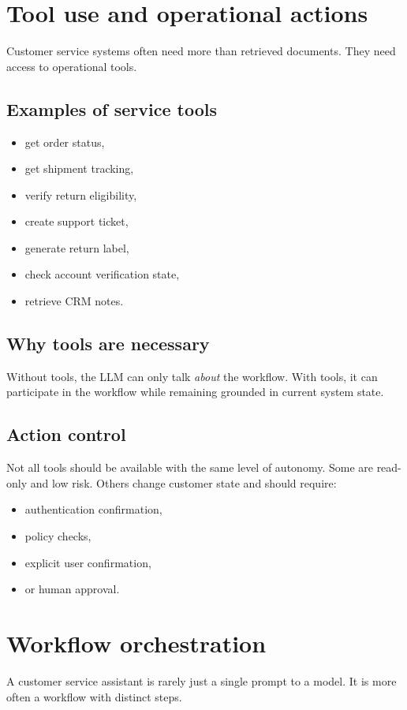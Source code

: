 \section{Tool use and operational actions}
Customer service systems often need more than retrieved documents.
They need access to operational tools.

\subsection{Examples of service tools}
\begin{itemize}
  \item get order status,
  \item get shipment tracking,
  \item verify return eligibility,
  \item create support ticket,
  \item generate return label,
  \item check account verification state,
  \item retrieve CRM notes.
\end{itemize}

\subsection{Why tools are necessary}
Without tools, the LLM can only talk \emph{about} the workflow.
With tools, it can participate in the workflow while remaining grounded in current system state.

\subsection{Action control}
Not all tools should be available with the same level of autonomy.
Some are read-only and low risk.
Others change customer state and should require:
\begin{itemize}
  \item authentication confirmation,
  \item policy checks,
  \item explicit user confirmation,
  \item or human approval.
\end{itemize}

\section{Workflow orchestration}
A customer service assistant is rarely just a single prompt to a model.
It is more often a workflow with distinct steps.

